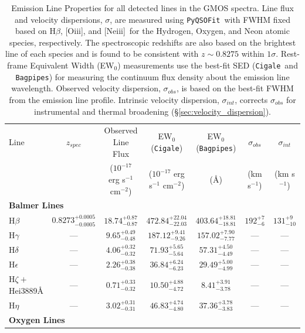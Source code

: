 \documentclass[twocolumn,tight,times,linenumbers]{aastex631}
\newcommand{\hbeta}{H$\beta$}
\newcommand{\oiii}{[O{\sc iii}]}
\newcommand{\neiii}{[Ne{\sc iii}]}
\newcommand{\pyqsofit}{\texttt{PyQSOFit}}
\newcommand{\cigale}{\texttt{Cigale}}
\newcommand{\bagpipes}{\texttt{Bagpipes}}
\begin{document}
		\begin{table}
			\centering
			\caption{Emission Line Properties for all detected lines in the GMOS spectra. Line flux and velocity dispersions, $\sigma$, are measured using \pyqsofit~with FWHM fixed based on \hbeta, \oiii, and \neiii~for the Hydrogen, Oxygen, and Neon atomic species, respectively. The spectroscopic redshifts are also based on the brightest line of each species and is found to be consistent with $z \sim 0.8275$ within $1\sigma$. Rest-frame Equivalent Width (EW$_0$) measurements use the best-fit SED (\cigale~and \bagpipes) for measuring the continuum flux density about the emission line wavelength. Observed velocity dispersion, $\sigma_{obs}$, is based on the best-fit FWHM from the emission line profile. Intrinsic velocity dispersion, $\sigma_{int}$, corrects $\sigma_{obs}$ for instrumental and thermal broadening (\S\ref{sec:velocity_dispersion}).}
			\begin{tabular*}{\textwidth}{@{\extracolsep{\fill}}lcccccc}
				\hline
				Line & $z_{spec}$ & Observed Line Flux  & EW$_0$ (\verb|Cigale|)& EW$_0$ (\verb|Bagpipes|) & $ \sigma_{obs}$& $\sigma_{int}$\\
				&                     &  ($10^{-17}$ erg s$^{-1}$ cm$^{-2}$) & ($10^{-17}$ erg s$^{-1}$ cm$^{-2}$) & (\AA) & (km s$^{-1}$)  & (km s$^{-1}$) \\
				\hline
				\multicolumn{7}{l}{{\textbf{Balmer Lines}}}\\
				\hbeta & $0.8273^{+0.0005}_{-0.0005}$ & $18.74^{+0.87}_{-0.87}$ & $472.84^{+22.04}_{-22.03}$ & $403.64^{+18.81}_{-18.81}$ & $192^{+7}_{-6}$ & $131^{+9}_{-10}$ \\
				H$\gamma$ & --- & $9.65^{+0.49}_{-0.48}$ & $187.12^{+9.41}_{-9.26}$ & $157.02^{+7.90}_{-7.77}$ & --- & --- \\
				H$\delta$ & --- & $4.06^{+0.32}_{-0.32}$ & $71.93^{+5.65}_{-5.64}$ & $57.31^{+4.50}_{-4.49}$ & --- & --- \\
				H$\epsilon$ & --- & $2.26^{+0.38}_{-0.38}$ & $36.84^{+6.24}_{-6.23}$ & $29.49^{+5.00}_{-4.99}$ & --- & --- \\
				H$\zeta+$He{\sc i}3889\AA & --- & $0.71^{+0.33}_{-0.32}$ & $10.50^{+4.88}_{-4.72}$ & $8.41^{+3.91}_{-3.78}$ & --- & --- \\
				H$\eta$ & --- & $3.02^{+0.31}_{-0.31}$ & $46.83^{+4.74}_{-4.80}$ & $37.36^{+3.78}_{-3.83}$ & --- & --- \\
				\hline
				\multicolumn{7}{l}{{\textbf{Oxygen Lines}}}				\\    	    			    					

\end{tabular*}
\end{table}
\end{document}
